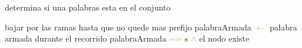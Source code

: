 \begin{algorithm}
\caption{determina si una palabras esta en el conjunto}
\begin{algorithmic}[1]
			\STATE bajar por las ramas hasta que no quede mas prefijo
			\STATE palabraArmada \textcolor{orange}{$\leftarrow$} palabra armada durante el recorrido
			\RETURN palabraArmada \textcolor{orange}{==} s \textcolor{orange}{$\wedge$} el nodo existe
\end{algorithmic}
\end{algorithm}		





